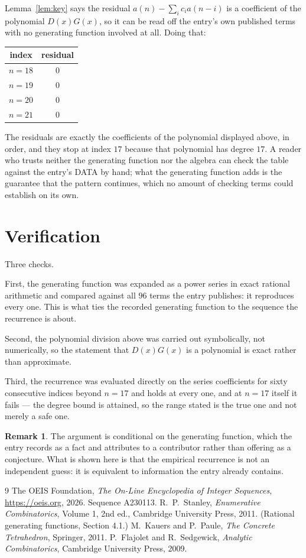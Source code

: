 \documentclass[11pt,a4paper]{article}
\theoremstyle{plain}
\theoremstyle{definition}
\newtheorem{remark}[theorem]{Remark}
\begin{document}
Lemma~\ref{lem:key} says the residual $a(n)-\sum_ic_ia(n-i)$ is a coefficient of the
polynomial $D(x)G(x)$, so it can be read off the entry's own published terms with no
generating function involved at all. Doing that:
\begin{center}
\begin{tabular}{cc}
index & residual \\ \hline
$n=18$ & $0$ \\
$n=19$ & $0$ \\
$n=20$ & $0$ \\
$n=21$ & $0$
\end{tabular}
\end{center}
The residuals are exactly the coefficients of the polynomial displayed above, in order, and
they stop at index $17$ because that polynomial has degree $17$. A reader who trusts
neither the generating function nor the algebra can check the table against the entry's DATA
by hand; what the generating function adds is the guarantee that the pattern continues, which
no amount of checking terms could establish on its own.

\section{Verification}

Three checks.

First, the generating function was expanded as a power series in exact rational arithmetic and
compared against all $96$ terms the entry publishes: it reproduces every one. This is
what ties the recorded generating function to the sequence the recurrence is about.

Second, the polynomial division above was carried out symbolically, not numerically, so the
statement that $D(x)G(x)$ is a polynomial is exact rather than approximate.

Third, the recurrence was evaluated directly on the series coefficients for sixty consecutive
indices beyond $n=17$ and holds at every one, and at $n=17$ itself it fails --- the
degree bound is attained, so the range stated is the true one and not merely a safe one.

\begin{remark}
The argument is conditional on the generating function, which the entry records as a fact and
attributes to a contributor rather than offering as a conjecture. What is shown here is that
the empirical recurrence is not an independent guess: it is equivalent to information the
entry already contains.
\end{remark}

\begin{thebibliography}{9}
 The OEIS Foundation, \emph{The On-Line Encyclopedia of Integer
Sequences}, \url{https://oeis.org}, 2026. Sequence A230113.
 R.~P.~Stanley, \emph{Enumerative Combinatorics}, Volume 1, 2nd ed.,
Cambridge University Press, 2011. (Rational generating functions, Section 4.1.)
 M.~Kauers and P.~Paule, \emph{The Concrete Tetrahedron}, Springer, 2011.
 P.~Flajolet and R.~Sedgewick, \emph{Analytic Combinatorics}, Cambridge
University Press, 2009.
\end{thebibliography}
\end{document}
